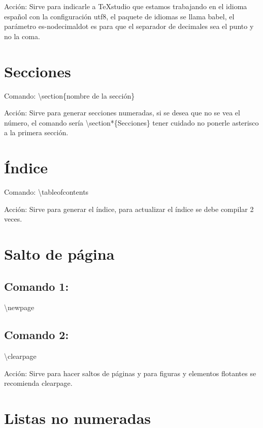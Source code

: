 \documentclass[a4paper,11pt]{article}
\begin{document}
\begin{flushleft}
		Acción: Sirve para indicarle a TeXstudio que estamos trabajando en el idioma español con la configuración utf8, el paquete de idiomas se llama babel, el parámetro es-nodecimaldot es para que el separador de decimales sea el punto y no  la coma.\newline
		
		\section{Secciones}
		
		Comando: \textbackslash section\{nombre de la sección\}\newline
		
		Acción: Sirve para generar secciones numeradas, si se desea que no  se vea el número, el comando  sería \textbackslash section*\{Secciones\} tener cuidado no ponerle asterisco a la primera sección.\newline
		
		\section{Índice}
		
		Comando: \textbackslash tableofcontents\newline
		
		Acción: Sirve para generar el índice, para actualizar el índice se debe compilar 2 veces.\newline
		
		\section{Salto de página}
		
		\subsection{Comando 1:} \textbackslash newpage\newline
		\subsection{Comando 2:} \textbackslash clearpage\newline
		
		Acción: Sirve para hacer saltos de páginas y para figuras y elementos flotantes se recomienda clearpage.\newline
		
		\section{Listas no numeradas}
		

\end{flushleft}
\end{document}
